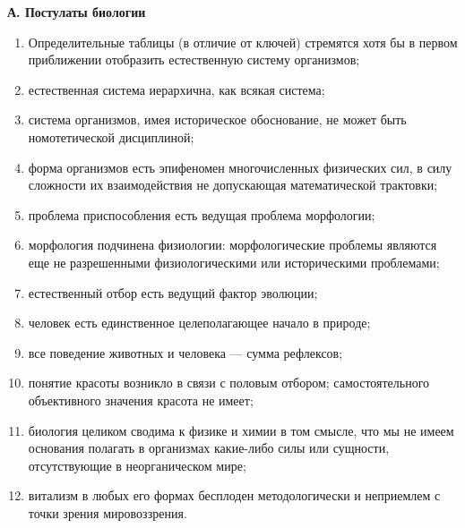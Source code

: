 \begin{center}
  \textbf{А. Постулаты биологии}
\end{center}

\begin{enumerate}

  \item Определительные таблицы (в отличие от ключей) стремятся хотя
        бы в первом приближении отобразить естественную систему
        организмов;

  \item естественная система иерархична, как всякая система;

  \item система организмов, имея историческое обоснование, не может
        быть номотетической дисциплиной;

  \item форма организмов есть эпифеномен многочисленных физических
        сил, в силу сложности их взаимодействия не допускающая
        математической трактовки;

  \item проблема приспособления есть ведущая проблема морфологии;

  \item морфология подчинена физиологии: морфологические проблемы
        являются еще не разрешенными физиологическими или
        историческими проблемами;

  \item естественный отбор есть ведущий фактор эволюции;

  \item человек есть единственное целеполагающее начало в природе;

  \item все поведение животных и человека --- сумма рефлексов;

  \item понятие красоты возникло в связи с половым отбором;
        самостоятельного объективного значения красота не имеет;

  \item биология целиком сводима к физике и химии в том смысле, что мы
        не имеем основания полагать в организмах какие-либо силы или
        сущности, отсутствующие в неорганическом мире;

  \item витализм в любых его формах бесплоден методологически и
        неприемлем с точки зрения мировоззрения.

\end{enumerate}


